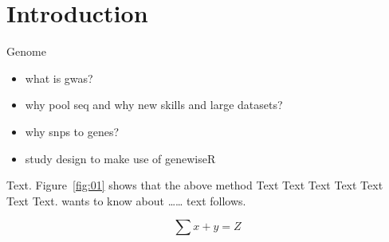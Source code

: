 \documentclass{bioinfo}
\begin{document}
\section{Introduction}

Genome

\begin{itemize}
\item what is gwas?
\item why pool seq and why new skills and large datasets?
\item why snps to genes?
\item study design to make use of genewiseR
\end{itemize}


 Text. Figure~\ref{fig:01} shows that the above method  Text Text Text Text  Text Text Text.  \citep{Bag01} wants to know about …… text follows.

\begin{equation}
\sum x+ y =Z\label{eq:01}
\end{equation}
\end{document}
